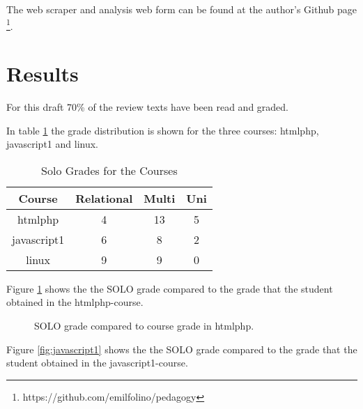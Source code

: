 \documentclass[twoside,twocolumn,a4paper,11pt,english]{article}
\begin{document}
The web scraper and analysis web form can be found at the author's Github page \footnote{https://github.com/emilfolino/pedagogy}.




\section{Results}

For this draft 70\% of the review texts have been read and graded.

In table \ref{table:solo} the grade distribution is shown for the three courses: htmlphp, javascript1 and linux.

\begin{table}[H]
\caption{Solo Grades for the Courses}
\centering
\begin{tabular}{c | c c c}
Course & Relational & Multi & Uni \\ [0.5ex] %
\hline
htmlphp & 4 & 13 & 5 \\
javascript1 & 6 & 8 & 2 \\
linux & 9 & 9 & 0 \\ [1ex]
\end{tabular}
\label{table:solo}
\end{table}

Figure \ref{fig:htmlphp} shows the the SOLO grade compared to the grade that the student obtained in the htmlphp-course.

\begin{figure}[H]
\label{fig:htmlphp}
\caption{SOLO grade compared to course grade in htmlphp.}
\end{figure}


Figure \ref{fig:javascript1} shows the the SOLO grade compared to the grade that the student obtained in the javascript1-course.
\end{document}
